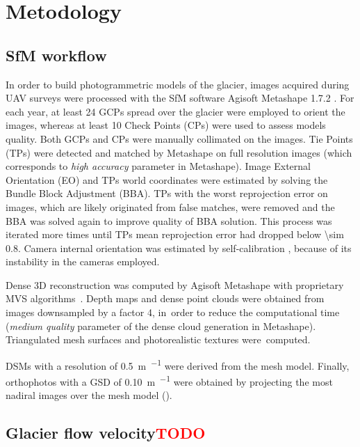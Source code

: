 \section{Metodology}\label{sec:3:methodology}

\subsection{SfM workflow}\label{sec:3:sfm}

In order to build photogrammetric models of the glacier, images acquired during UAV
surveys were processed with the SfM software Agisoft Metashape 1.7.2 \citep{agisoft}.
For each year, at least 24 GCPs spread over the glacier were employed to orient the
images, whereas at least 10 Check Points (CPs) were used to assess models quality.
Both GCPs and CPs were manually collimated on the images.
Tie Points (TPs) were detected and matched by Metashape on full resolution images (which
corresponds to \textit{high accuracy} parameter in Metashape).
Image External Orientation (EO) and TPs world coordinates were estimated by solving the
Bundle Block Adjustment (BBA).
TPs with the worst reprojection error on images, which are likely originated from false
matches, were removed and the BBA was solved again to improve quality of BBA solution.
This process was iterated more times until TPs mean reprojection error had dropped below
\SI{\sim 0.8}{\pixel}.
Camera internal orientation was estimated by self-calibration
\citep{Fraser2013,Cramer2017}, because of its instability in the cameras employed.

Dense 3D reconstruction was computed by Agisoft Metashape with proprietary MVS
algorithms~\citep{Dallasta}.
Depth maps and dense point clouds were obtained from images downsampled by a factor 4,
in~order to reduce the computational time (\textit{medium quality} parameter of the dense
cloud generation in Metashape).
Triangulated mesh surfaces and photorealistic textures were~computed.

DSMs with a resolution of \SI{0.5}{\meter\per\pixel} were derived from the mesh model.
Finally, orthophotos with a GSD of \SI{0.10}{\meter\per\pixel} were obtained by
projecting the most nadiral images over the mesh model ().

\subsection{Glacier flow velocity\textcolor{red}{TODO}}\label{sec:3:method_velocity}

